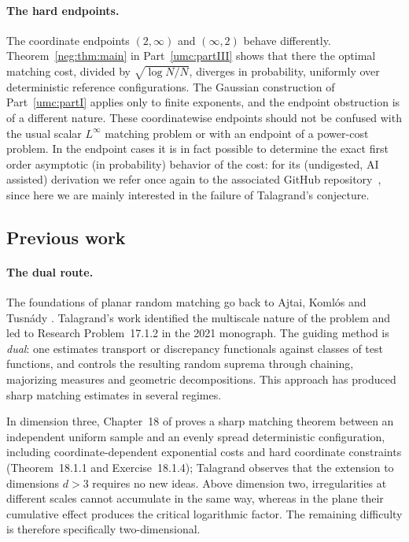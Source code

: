 \documentclass[11pt]{article}
\theoremstyle{definition}
\theoremstyle{remark}
\numberwithin{equation}{section}
\begin{document}
\paragraph{The hard endpoints.}
The coordinate endpoints $(2,\infty)$ and $(\infty,2)$ behave
differently. Theorem~\ref{neg:thm:main} in Part~\ref{umc:partIII}
shows that there the optimal matching cost, divided by
$\sqrt{\log N/N}$, diverges in probability, uniformly over deterministic
reference configurations. The Gaussian construction of
Part~\ref{umc:partI} applies only to finite exponents, and the
endpoint obstruction is of a different nature. These coordinatewise
endpoints should not be confused with the usual scalar $L^\infty$
matching problem or with an endpoint of a power-cost problem.
In the endpoint cases it is in fact possible to determine the exact first
order asymptotic (in probability) behavior of the cost: for its (undigested,
AI assisted) derivation we refer once again to the associated GitHub
repository~\cite{umc:repository}, since here we are mainly interested in the
failure of Talagrand's conjecture.

\subsection{Previous work}

\paragraph{The dual route.}
The foundations of planar random matching go back to Ajtai,
Koml\'os and Tusn\'ady \cite{umc:AKT84}. Talagrand's work
\cite{umc:Talagrand92,umc:Talagrand2005,umc:Talagrand2021}
identified the multiscale nature of the problem and led
to Research Problem~17.1.2 in the 2021 monograph.
The guiding method is \emph{dual}: one estimates transport or
discrepancy functionals against classes of test functions, and
controls the resulting random suprema through chaining, majorizing
measures and geometric decompositions. This approach has produced
sharp matching estimates in several regimes.

In dimension three, Chapter~18 of \cite{umc:Talagrand2021} proves a
sharp matching theorem between an independent uniform sample and an
evenly spread deterministic configuration, including
coordinate-dependent exponential costs and hard coordinate
constraints (Theorem~18.1.1 and Exercise~18.1.4); Talagrand observes
that the extension to dimensions $d>3$ requires no new ideas. Above
dimension two, irregularities at different scales cannot accumulate
in the same way, whereas in the plane their cumulative effect produces the critical
logarithmic factor. The remaining difficulty is therefore specifically
two-dimensional.
\end{document}
